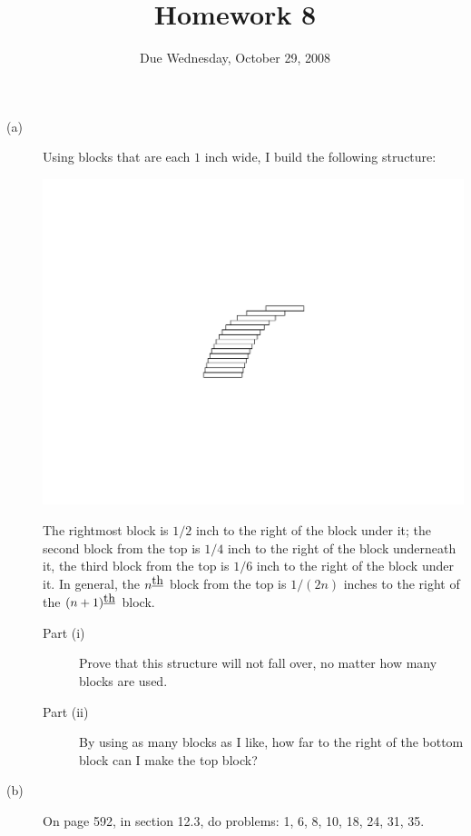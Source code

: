\documentclass[12pt]{article}
\title{Homework 8}
\date{Due Wednesday, October 29, 2008}
\begin{document}
\maketitle

\begin{description}

\item[(a)] Using blocks that are each $1$ inch wide, I build the
  following structure:
\begin{center}
\includegraphics{blocks.pdf}
\end{center}
\noindent
The rightmost block is $1/2$ inch to the right of the block under it;
the second block from the top is $1/4$ inch to the right of the block
underneath it, the third block from the top is $1/6$ inch to the right
of the block under it.  In general, the $n^{\mbox{\underline{th}}}$
block from the top is $1/(2n)$ inches to the right of the
$(n+1)^{\mbox{\underline{th}}}$ block.
\begin{description}
\item[Part (i)] Prove that this structure will not fall over, no
matter how many blocks are used.
\item[Part (ii)] By using as many blocks as I like, how far to the
  right of the bottom block can I make the top block?
\end{description}

\vfill

\item[(b)] On page 592, in section 12.3, do problems: 1, 6, 8, 10, 18, 24, 31, 35.

\vfill

\end{description}
\end{document}
